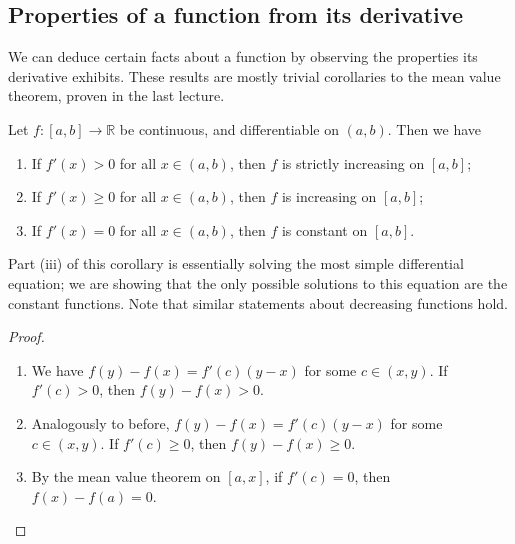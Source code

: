 \subsection{Properties of a function from its derivative}
We can deduce certain facts about a function by observing the properties its derivative exhibits.
These results are mostly trivial corollaries to the mean value theorem, proven in the last lecture.
\begin{corollary}
	Let \(f \colon [a,b] \to \mathbb R\) be continuous, and differentiable on \((a, b)\).
	Then we have
	\begin{enumerate}
		\item If \(f'(x) > 0\) for all \(x \in (a, b)\), then \(f\) is strictly increasing on \([a, b]\);
		\item If \(f'(x) \geq 0\) for all \(x \in (a, b)\), then \(f\) is increasing on \([a, b]\);
		\item If \(f'(x) = 0\) for all \(x \in (a, b)\), then \(f\) is constant on \([a, b]\).
	\end{enumerate}
\end{corollary}
\noindent Part (iii) of this corollary is essentially solving the most simple differential equation; we are showing that the only possible solutions to this equation are the constant functions.
Note that similar statements about decreasing functions hold.
\begin{proof}
	\begin{enumerate}
		\item We have \(f(y) - f(x) = f'(c)(y-x)\) for some \(c \in (x, y)\).
		      If \(f'(c) > 0\), then \(f(y) - f(x) > 0\).
		\item Analogously to before, \(f(y) - f(x) = f'(c)(y-x)\) for some \(c \in (x, y)\).
		      If \(f'(c) \geq 0\), then  \(f(y) - f(x) \geq 0\).
		\item By the mean value theorem on \([a, x]\), if \(f'(c) = 0\), then \(f(x) - f(a) = 0\).
	\end{enumerate}
\end{proof}

